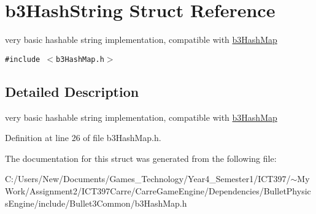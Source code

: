 \hypertarget{structb3_hash_string}{
\section{b3HashString Struct Reference}
\label{structb3_hash_string}
}
very basic hashable string implementation, compatible with \hyperlink{classb3_hash_map}{b3HashMap}  


{\tt \#include $<$b3HashMap.h$>$}



\subsection{Detailed Description}
very basic hashable string implementation, compatible with \hyperlink{classb3_hash_map}{b3HashMap} 

Definition at line 26 of file b3HashMap.h.

The documentation for this struct was generated from the following file:\begin{CompactItemize}
\item 
C:/Users/New/Documents/Games\_\-Technology/Year4\_\-Semester1/ICT397/$\sim$My Work/Assignment2/ICT397Carre/CarreGameEngine/Dependencies/BulletPhysicsEngine/include/Bullet3Common/b3HashMap.h\end{CompactItemize}
